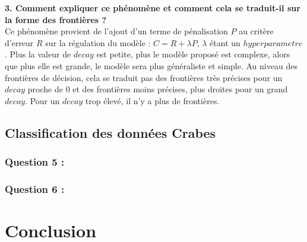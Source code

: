 \documentclass[a4paper, 10pt]{article}
\begin{document}
\textbf{3. Comment expliquer ce phénomène et comment cela se traduit-il sur la forme des frontières ?}\\
Ce phénomène provient de l'ajout d'un terme de pénalisation $P$ au critère d'erreur $R$ sur la régulation du modèle : $C = R + \lambda P$, $\lambda$ étant un $hyperparametre$.
Plus la valeur de $decay$ est petite, plus le modèle proposé est complexe, alors que plus elle est grande, le modèle sera plus généraliste et simple. Au niveau des frontières de décision, cela se traduit pas des frontières très précises pour un $decay$ proche de 0 et des frontières moins précises, plus droites pour un grand $decay$. Pour un $decay$ trop élevé, il n'y a plus de frontières.

\subsection*{Classification des données Crabes}

\subsubsection*{Question 5 :}

\subsubsection*{Question 6 :}

\section*{Conclusion}
\end{document}
